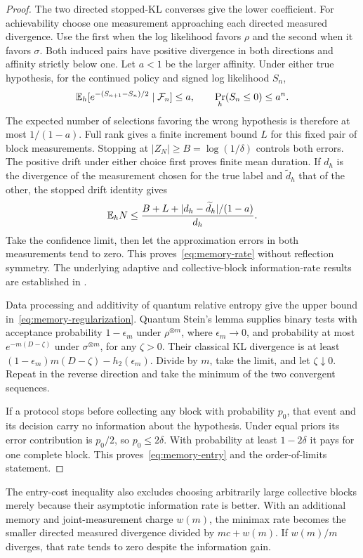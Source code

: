 \begin{proof}
The two directed stopped-KL converses give the lower coefficient.
For achievability choose one measurement approaching each directed
measured divergence. Use the first when the log likelihood favors
$\rho$ and the second when it favors $\sigma$. Both induced pairs have
positive divergence in both directions and affinity strictly below one.
Let $a<1$ be the larger affinity. Under either true hypothesis, for the
continued policy and signed log likelihood $S_n$,
\[
 \mathbb E_h[e^{-(S_{n+1}-S_n)/2}\mid\mathcal F_n]\leq a,
 \qquad \Pr_h(S_n\leq0)\leq a^n.
\]
The expected number of selections favoring the wrong hypothesis is
therefore at most $1/(1-a)$. Full rank gives a finite increment bound
$L$ for this fixed pair of block measurements. Stopping at
$|Z_N|\geq B=\log(1/\delta)$ controls both errors. The positive drift
under either choice first proves finite mean duration. If $d_h$ is
the divergence of the measurement chosen for the true label and
$\widetilde d_h$ that of the other, the stopped drift identity gives
\[
 \mathbb E_h N\leq
 \frac{B+L+|d_h-\widetilde d_h|/(1-a)}{d_h}.
\]
Take the confidence limit, then let the approximation errors in both
measurements tend to zero. This proves~\eqref{eq:memory-rate} without
reflection symmetry. The underlying adaptive and collective-block
information-rate results are established in \citet{li2022}.

Data processing and additivity of quantum relative entropy give the
upper bound in~\eqref{eq:memory-regularization}. Quantum Stein's lemma
\citep{ogawa2000} supplies binary tests with acceptance probability
$1-\epsilon_m$ under $\rho^{\otimes m}$, where $\epsilon_m\to0$,
and probability at most $e^{-m(D-\zeta)}$ under $\sigma^{\otimes m}$,
for any $\zeta>0$. Their classical KL divergence is at least
$(1-\epsilon_m)m(D-\zeta)-h_2(\epsilon_m)$.
Divide by $m$, take the limit, and let $\zeta\downarrow0$.
Repeat in the reverse direction and take the minimum of the two
convergent sequences.

If a protocol stops before collecting any block with probability $p_0$,
that event and its decision carry no information about the hypothesis.
Under equal priors its error contribution is $p_0/2$, so $p_0\leq2\delta$.
With probability at least $1-2\delta$ it pays for one complete block.
This proves~\eqref{eq:memory-entry} and the order-of-limits statement.
\end{proof}
The entry-cost inequality also excludes choosing arbitrarily large
collective blocks merely because their asymptotic information rate is
better. With an additional memory and joint-measurement charge $w(m)$,
the minimax rate becomes the smaller directed measured divergence
divided by $mc+w(m)$.
If $w(m)/m$ diverges, that rate tends to zero despite the information gain.


